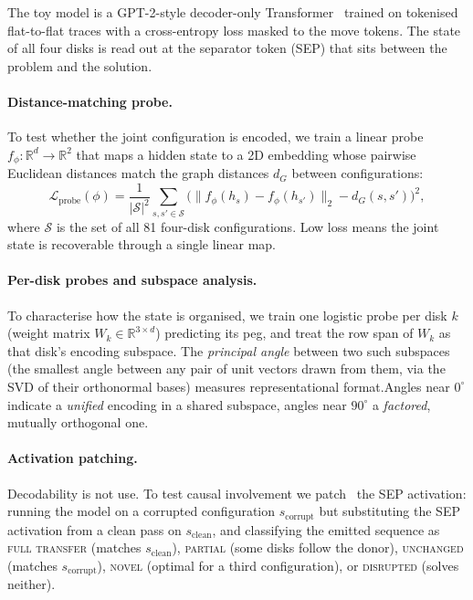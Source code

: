 \documentclass{article} %
\begin{document}
The toy model is a GPT-2-style decoder-only Transformer~\citep{radford2019language} trained on tokenised flat-to-flat traces with a cross-entropy loss masked to the move tokens. The state of all four disks is read out at the separator token (SEP) that sits between the problem and the solution.

\paragraph{Distance-matching probe.} To test whether the joint configuration is encoded, we train a linear probe $f_\phi:\mathbb{R}^d\!\to\!\mathbb{R}^2$ that maps a hidden state to a 2D embedding whose pairwise Euclidean distances match the graph distances $d_G$ between configurations:
\begin{equation}\label{eq:distance-probe}
    \mathcal{L}_{\text{probe}}(\phi) = \frac{1}{|\mathcal{S}|^2} \sum_{s, s' \in \mathcal{S}} \bigl( \|f_\phi(h_s) - f_\phi(h_{s'})\|_2 - d_G(s, s') \bigr)^2,
\end{equation}
where $\mathcal{S}$ is the set of all 81 four-disk configurations. Low loss means the joint state is recoverable through a single linear map.

\paragraph{Per-disk probes and subspace analysis.} To characterise how the state is organised, we train one logistic probe per disk $k$ (weight matrix $W_k\in\mathbb{R}^{3\times d}$) predicting its peg, and treat the row span of $W_k$ as that disk's encoding subspace. The \emph{principal angle} between two such subspaces (the smallest angle between any pair of unit vectors drawn from them, via the SVD of their orthonormal bases) measures representational format.Angles near $0^\circ$ indicate a \emph{unified} encoding in a shared subspace, angles near $90^\circ$ a \emph{factored}, mutually orthogonal one.

\paragraph{Activation patching.} Decodability is not use. To test causal involvement we patch~\citep{meng2022locating} the SEP activation: running the model on a corrupted configuration $s_\text{corrupt}$ but substituting the SEP activation from a clean pass on $s_\text{clean}$, and classifying the emitted sequence as \textsc{full transfer} (matches $s_\text{clean}$), \textsc{partial} (some disks follow the donor), \textsc{unchanged} (matches $s_\text{corrupt}$), \textsc{novel} (optimal for a third configuration), or \textsc{disrupted} (solves neither).
\end{document}
